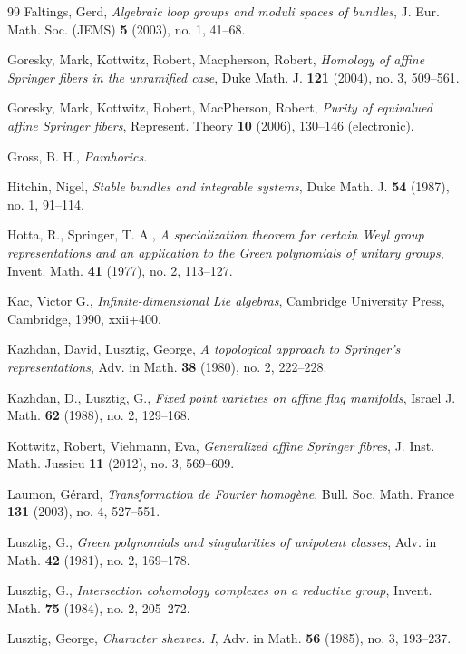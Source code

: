 \begin{thebibliography}{99}
 Faltings, Gerd, \emph{Algebraic loop groups and moduli spaces of bundles}, J. Eur. Math. Soc. (JEMS) \textbf{5} (2003), no. 1, 41--68.

 Goresky, Mark, Kottwitz, Robert, Macpherson, Robert, \emph{Homology of affine Springer fibers in the unramified case}, Duke Math. J. \textbf{121} (2004), no. 3, 509--561.

 Goresky, Mark, Kottwitz, Robert, MacPherson, Robert, \emph{Purity of equivalued affine Springer fibers}, Represent. Theory \textbf{10} (2006), 130--146 (electronic).

 Gross, B. H., \emph{Parahorics}.

 Hitchin, Nigel, \emph{Stable bundles and integrable systems}, Duke Math. J. \textbf{54} (1987), no. 1, 91--114.

 Hotta, R., Springer, T. A., \emph{A specialization theorem for certain Weyl group representations and an application to the Green polynomials of unitary groups}, Invent. Math. \textbf{41} (1977), no. 2, 113--127.

 Kac, Victor G., \emph{Infinite-dimensional Lie algebras}, Cambridge University Press, Cambridge, 1990, xxii+400.

 Kazhdan, David, Lusztig, George, \emph{A topological approach to Springer's representations}, Adv. in Math. \textbf{38} (1980), no. 2, 222--228.

 Kazhdan, D., Lusztig, G., \emph{Fixed point varieties on affine flag manifolds}, Israel J. Math. \textbf{62} (1988), no. 2, 129--168.

 Kottwitz, Robert, Viehmann, Eva, \emph{Generalized affine Springer fibres}, J. Inst. Math. Jussieu \textbf{11} (2012), no. 3, 569--609.

 Laumon, G{\'e}rard, \emph{Transformation de Fourier homog\`ene}, Bull. Soc. Math. France \textbf{131} (2003), no. 4, 527--551.

 Lusztig, G., \emph{Green polynomials and singularities of unipotent classes}, Adv. in Math. \textbf{42} (1981), no. 2, 169--178.

 Lusztig, G., \emph{Intersection cohomology complexes on a reductive group}, Invent. Math. \textbf{75} (1984), no. 2, 205--272.

 Lusztig, George, \emph{Character sheaves. I}, Adv. in Math. \textbf{56} (1985), no. 3, 193--237.


\end{thebibliography}
